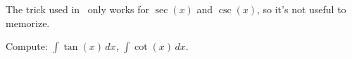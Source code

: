 \begin{Remark}{}{}
    The trick used in~ only works for $ \sec(x) $ and
    $ \csc(x) $, so it's not useful to memorize.
\end{Remark}

\begin{Exercise}{}{}
    Compute:
    $ \displaystyle\int \tan(x)\, d{x} $, $ \displaystyle\int \cot(x)\, d{x} $.
\end{Exercise}
